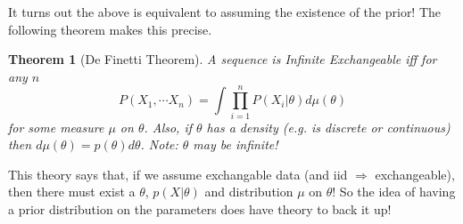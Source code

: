 \documentclass[]{article}
\theoremstyle{mattstyle}
\newtheorem{theorem}{Theorem}[section]
\theoremstyle{definition}
\begin{document}
It turns out the above is equivalent to assuming the existence of the prior! The following theorem makes this precise.

\begin{theorem}[De Finetti Theorem]
	A sequence is Infinite Exchangeable iff for any \(n\)
	$$ P(X_1, \cdots X_n) = \int\prod_{i=1}^n P(X_i|\theta)d\mu(\theta) $$
	for some measure \(\mu\) on \(\theta\). Also, if $\theta$ has a density (e.g. is discrete or continuous) then $d\mu(\theta) = p(\theta)d\theta$. Note: \(\theta\) may be infinite!
\end{theorem}

This theory says that, if we assume exchangable data (and iid $\Rightarrow$ exchangeable), then there must exist a \(\theta\), \(p(X|\theta)\) and distribution \(\mu\) on \(\theta\)! So the idea of having a prior distribution on the parameters does have theory to back it up!


\newpage



\end{document}
